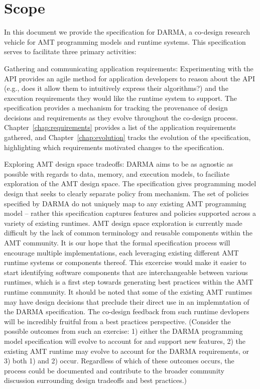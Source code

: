 \section{Scope}\label{sec:scope}
In this document we provide the specification for DARMA,
a co-design research vehicle for \gls{AMT} programming models and runtime
systems.  This specification serves to facilitate three primary activities: 
\begin{compactdesc}
\item[Gathering and communicating application requirements:]
Experimenting with the \gls{API} provides an agile method for application
developers to reason about the \gls{API} (e.g., does it allow them to intuitively
    express their algorithms?) and the execution requirements they would like
the runtime system to support.
The specification provides a mechanism for tracking the
provenance of design decisions and requirements as they evolve throughout the co-design
process. Chapter~\ref{chap:requirements} provides a list of the application
requirements gathered,  and
Chapter~\ref{chap:evolution} tracks the evolution of
the specification, highlighting which requirements
motivated changes to the specification.
\item[Exploring AMT design space tradeoffs:]
DARMA aims to be as agnostic as possible with regards to data, memory, and execution
models, to faciliate exploration of the AMT design space. The specification 
gives programming model design that seeks to clearly separate policy from
mechanism.
 The set of policies specified by DARMA do not uniquely map to any existing AMT programming model -- rather this specification captures features and policies
supported across a variety of existing runtimes.
\gls{AMT} design space exploration is currently made difficult by the lack of
common terminology and reusable components within the \gls{AMT} community.  It
is our hope that the formal specification process will encourage multiple
implementations, each leveraging
existing different \gls{AMT} runtime systems or components thereof.  
This excercise would make it easier to start identifying 
software components that are interchangeable between various runtimes, which is a first
step towards generating best practices within the \gls{AMT} runtime community.
It should be noted that some of the existing \gls{AMT} runtimes 
may have design decisions that preclude their direct use in an implemntation of the
DARMA specification. The co-design feedback from such runtime devlopers 
will be incredibly fruitful from a best practices perspective. (Consider 
the possible outcomes from such an exercise: 1) either the DARMA 
programming model specification will evolve to account for and support new
features, 2) the existing \gls{AMT} runtime may evolve to account for the DARMA
requirements, or 3) both 1) and 2) occur.  Regardless of which of these
outcomes occurs, the process could be documented and contribute to the
broader community discussion surrounding design tradeoffs and best practices.) 


\end{compactdesc}
